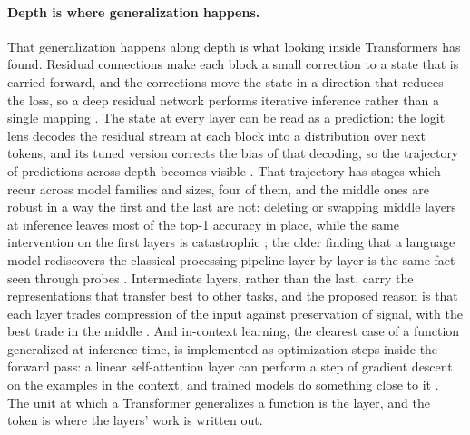\paragraph{Depth is where generalization happens.}
\label{sec:depth}
That generalization happens along depth is what looking inside Transformers has found. Residual
connections make each block a small correction to a state that is carried forward, and the corrections
move the state in a direction that reduces the loss, so a deep residual network performs iterative
inference rather than a single mapping \citep{jastrzebski2018}. The state at every layer can be read as
a prediction: the logit lens decodes the residual stream at each block into a distribution over next
tokens, and its tuned version corrects the bias of that decoding, so the trajectory of predictions
across depth becomes visible \citep{nostalgebraist2020,belrose2023}. That trajectory has stages which
recur across model families and sizes, four of them, and the middle ones are robust in a way the first
and the last are not: deleting or swapping middle layers at inference leaves most of the top-1 accuracy
in place, while the same intervention on the first layers is catastrophic \citep{lad2024}; the older
finding that a language model rediscovers the classical processing pipeline layer by layer is the same
fact seen through probes \citep{tenney2019}. Intermediate layers, rather than the last, carry the
representations that transfer best to other tasks, and the proposed reason is that each layer trades
compression of the input against preservation of signal, with the best trade in the middle
\citep{skean2025}. And in-context learning, the clearest case of a function generalized at inference
time, is implemented as optimization steps inside the forward pass: a linear self-attention layer can
perform a step of gradient descent on the examples in the context, and trained models do something
close to it \citep{vonoswald2023}. The unit at which a Transformer generalizes a function is the layer,
and the token is where the layers' work is written out.

